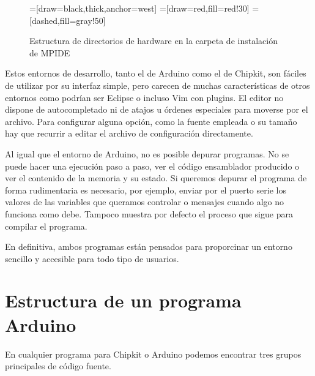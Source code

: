 \begin{figure}
\begin{center}
=[draw=black,thick,anchor=west]
=[draw=red,fill=red!30]
=[dashed,fill=gray!50]
\end{center}
\caption{Estructura de directorios de hardware en la carpeta de instalación de MPIDE}
\label{mpide_carpetas}
\end{figure}

Estos entornos de desarrollo, tanto el de Arduino como el de Chipkit, son fáciles de utilizar por su interfaz simple, pero carecen de muchas características de otros entornos como podrían ser Eclipse o incluso Vim con plugins. El editor no dispone de autocompletado ni de atajos u órdenes especiales para moverse por el archivo. Para configurar alguna opción, como la fuente empleada o su tamaño hay que recurrir a editar el archivo de configuración directamente.

Al igual que el entorno de Arduino, no es posible depurar programas.  No se puede hacer una ejecución paso a paso, ver el código ensamblador producido o ver el contenido de la memoria y su estado.  Si queremos depurar el programa de forma rudimentaria es necesario, por ejemplo, enviar por el puerto serie los valores de las variables que queramos controlar o mensajes cuando algo no funciona como debe. Tampoco muestra por defecto el proceso que sigue para compilar el programa.

En definitiva, ambos programas están pensados para proporcinar un entorno sencillo y accesible para todo tipo de usuarios.

\section{Estructura de un programa Arduino}
En cualquier programa para Chipkit o Arduino podemos encontrar tres grupos principales de código fuente.
